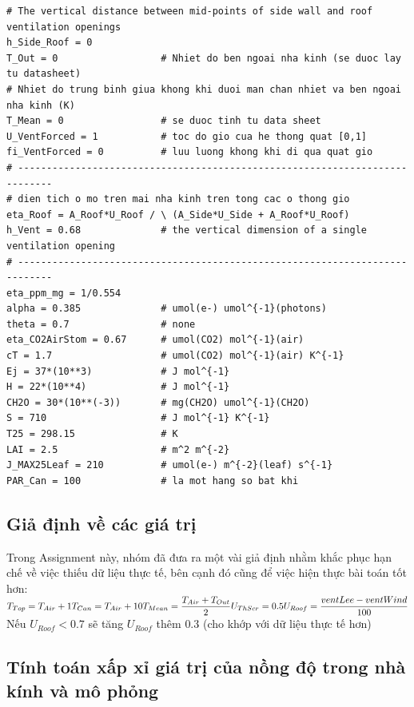\documentclass[13pt,a4paper]{article}
\begin{document}
\begin{lstlisting}
# The vertical distance between mid-points of side wall and roof ventilation openings
h_Side_Roof = 0
T_Out = 0    			   # Nhiet do ben ngoai nha kinh (se duoc lay tu datasheet)
# Nhiet do trung binh giua khong khi duoi man chan nhiet va ben ngoai nha kinh (K)
T_Mean = 0				   # se duoc tinh tu data sheet
U_VentForced = 1  		   # toc do gio cua he thong quat [0,1]
fi_VentForced = 0		   # luu luong khong khi di qua quat gio
# ----------------------------------------------------------------------------
# dien tich o mo tren mai nha kinh tren tong cac o thong gio
eta_Roof = A_Roof*U_Roof / \ (A_Side*U_Side + A_Roof*U_Roof)  
h_Vent = 0.68              # the vertical dimension of a single ventilation opening
# ----------------------------------------------------------------------------
eta_ppm_mg = 1/0.554
alpha = 0.385			   # umol(e-) umol^{-1}(photons)
theta = 0.7            	   # none
eta_CO2AirStom = 0.67      # umol(CO2) mol^{-1}(air)
cT = 1.7                   # umol(CO2) mol^{-1}(air) K^{-1}
Ej = 37*(10**3)            # J mol^{-1}
H = 22*(10**4)             # J mol^{-1}
CH2O = 30*(10**(-3))       # mg(CH2O) umol^{-1}(CH2O)
S = 710                    # J mol^{-1} K^{-1}
T25 = 298.15           	   # K
LAI = 2.5          		   # m^2 m^{-2}
J_MAX25Leaf = 210  	       # umol(e-) m^{-2}(leaf) s^{-1}
PAR_Can = 100      		   # la mot hang so bat khi
\end{lstlisting}

		\subsection{Giả định về các giá trị}
			Trong Assignment này, nhóm đã đưa ra một vài giả định nhằm khắc phục hạn chế về việc thiếu dữ liệu thực tế, bên cạnh đó cũng để việc hiện thực bài toán tốt hơn: \\
			$
				T_{Top} = T_{Air} + 1 \\
				T_{Can} = T_{Air} + 10 \\
				T_{Mean} = \dfrac{T_{Air} + T_{Out}}{2} \\
				U_{ThScr} = 0.5 \\
				U_{Roof} = \dfrac{ventLee - ventWind}{100}$ \\
				Nếu $U_{Roof} < 0.7$ sẽ tăng $U_{Roof}$ thêm $0.3$ (cho khớp với dữ liệu thực tế hơn)
		\subsection{Tính toán xấp xỉ giá trị của nồng độ  trong nhà kính và mô phỏng}
\end{document}

